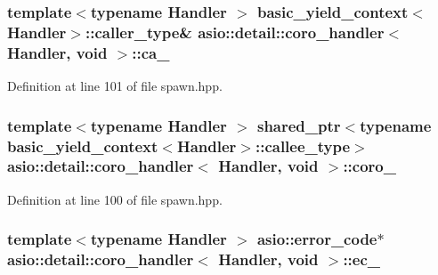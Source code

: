 \subsubsection[{ca\+\_\+}]{\setlength{\rightskip}{0pt plus 5cm}template$<$typename Handler $>$ {\bf basic\+\_\+yield\+\_\+context}$<$Handler$>$\+::caller\+\_\+type\& {\bf asio\+::detail\+::coro\+\_\+handler}$<$ Handler, void $>$\+::ca\+\_\+}\label{classasio_1_1detail_1_1coro__handler_3_01_handler_00_01void_01_4_ab55025d81a89f6d47e5ed21a1df6db03}


Definition at line 101 of file spawn.\+hpp.

\hypertarget{classasio_1_1detail_1_1coro__handler_3_01_handler_00_01void_01_4_ae5a8d2fe419cec49add65b2f41764d50}{}
\subsubsection[{coro\+\_\+}]{\setlength{\rightskip}{0pt plus 5cm}template$<$typename Handler $>$ shared\+\_\+ptr$<$typename {\bf basic\+\_\+yield\+\_\+context}$<$Handler$>$\+::callee\+\_\+type$>$ {\bf asio\+::detail\+::coro\+\_\+handler}$<$ Handler, void $>$\+::coro\+\_\+}\label{classasio_1_1detail_1_1coro__handler_3_01_handler_00_01void_01_4_ae5a8d2fe419cec49add65b2f41764d50}


Definition at line 100 of file spawn.\+hpp.

\hypertarget{classasio_1_1detail_1_1coro__handler_3_01_handler_00_01void_01_4_a44744027260f8715b6f2e02a573b70dd}{}
\subsubsection[{ec\+\_\+}]{\setlength{\rightskip}{0pt plus 5cm}template$<$typename Handler $>$ {\bf asio\+::error\+\_\+code}$\ast$ {\bf asio\+::detail\+::coro\+\_\+handler}$<$ Handler, void $>$\+::ec\+\_\+}\label{classasio_1_1detail_1_1coro__handler_3_01_handler_00_01void_01_4_a44744027260f8715b6f2e02a573b70dd}


